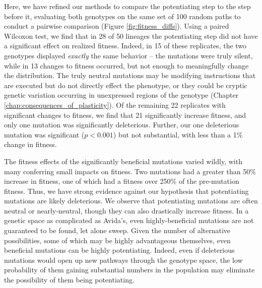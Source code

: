 Here, we have refined our methods to compare the potentiating step to the step before it, evaluating both genotypes on the same set of 100 random paths to conduct a pairwise comparison (Figure \ref{fig:fitness_diffs}). 
Using a paired Wilcoxon test, we find that in 28 of 50 lineages the potentiating step did not have a significant effect on realized fitness. 
Indeed, in 15 of these replicates, the two genotypes displayed \textit{exactly} the same behavior -- the mutations were truly silent, while in 13 changes to fitness occurred, but not enough to meaningfully change the distribution.
The truly neutral mutations may be modifying instructions that are executed but do not directly effect the phenotype, or they could be cryptic genetic variation occurring in unexpressed regions of the genotype (Chapter \ref{chap:consequences_of_plasticity}). 
Of the remaining 22 replicates with significant changes to fitness, we find that 21 significantly increase fitness, and only one mutation was significantly deleterious. 
Further, our one deleterious mutation was significant ($p < 0.001$) but not substantial, with less than a 1\% change in fitness. 

The fitness effects of the significantly beneficial mutations varied wildly,  with many conferring small impacts on fitness. 
Two mutations had a greater than 50\% increase in fitness, one of which had a fitness over 250\% of the pre-mutation fitness. 
Thus, we have strong evidence against our hypothesis that potentiating mutations are likely deleterious. 
We observe that potentiating mutations are often neutral or nearly-neutral, though they can also drastically increase fitness. 
In a genetic space as complicated as Avida's, even highly-beneficial mutations are not guaranteed to be found, let alone sweep.
Given the number of alternative possibilities, some of which may be highly advantageous themselves, even beneficial mutations can be highly potentiating.
Indeed, even if deleterious mutations would open up new pathways through the genotype space, the low probability of them gaining substantial numbers in the population may eliminate the possibility of them being potentiating.

